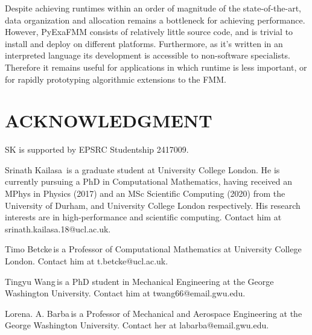 \documentclass{IEEEcsmag}
\begin{document}
Despite achieving runtimes within an order of magnitude of the state-of-the-art, data organization and allocation remains a bottleneck for achieving performance. However, PyExaFMM consists of relatively little source code, and is trivial to install and deploy on different platforms. Furthermore, as it's written in an interpreted language its development is accessible to non-software specialists. Therefore it remains useful for applications in which runtime is less important, or for rapidly prototyping algorithmic extensions to the FMM.

\section{ACKNOWLEDGMENT}

SK is supported by EPSRC Studentship 2417009.




\begin{IEEEbiography}{Srinath Kailasa}{\,} is a graduate student at University College London. He is currently pursuing a PhD in Computational Mathematics, having received an MPhys in Physics (2017) and an MSc Scientific Computing (2020) from the University of Durham, and University College London respectively. His research interests are in high-performance and scientific computing. Contact him at srinath.kailasa.18@ucl.ac.uk.
\end{IEEEbiography}

\begin{IEEEbiography}{Timo Betcke}{\,}is a Professor of Computational Mathematics at University College London. Contact him at t.betcke@ucl.ac.uk.
\end{IEEEbiography}

\begin{IEEEbiography}{Tingyu Wang}{\,}is a PhD student in Mechanical Engineering at the George Washington University. Contact him at twang66@email.gwu.edu.
\end{IEEEbiography}

\begin{IEEEbiography}{Lorena. A. Barba}{\,}is a Professor of Mechanical and Aerospace Engineering at the George Washington University.  Contact her at labarba@email.gwu.edu.
\end{IEEEbiography}
\end{document}
